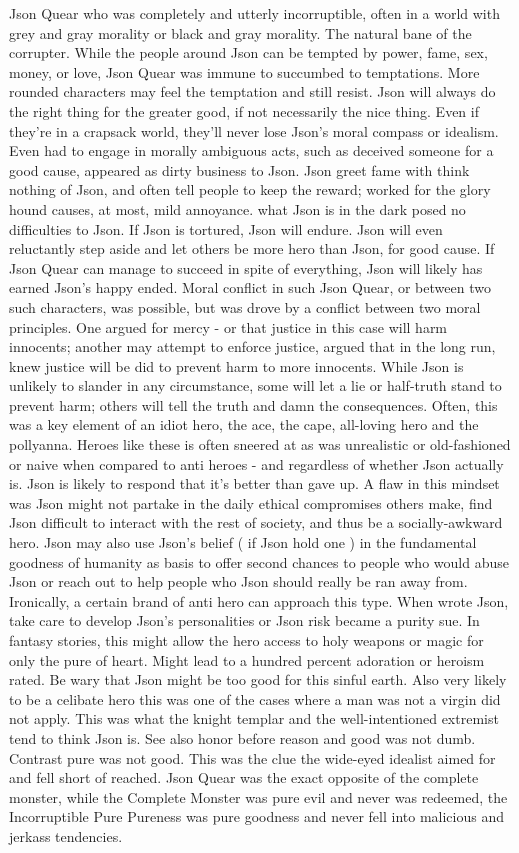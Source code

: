 \documentclass[12pt]{book}
\begin{document}
Json Quear who was completely and utterly incorruptible, often in a world with grey and gray morality or black and gray morality. The natural bane of the corrupter. While the people around Json can be tempted by power, fame, sex, money, or love, Json Quear was immune to succumbed to temptations. More rounded characters may feel the temptation and still resist. Json will always do the right thing for the greater good, if not necessarily the nice thing. Even if they're in a crapsack world, they'll never lose Json's moral compass or idealism. Even had to engage in morally ambiguous acts, such as deceived someone for a good cause, appeared as dirty business to Json. Json greet fame with think nothing of Json, and often tell people to keep the reward; worked for the glory hound causes, at most, mild annoyance. what Json is in the dark posed no difficulties to Json. If Json is tortured, Json will endure. Json will even  reluctantly  step aside and let others be more hero than Json, for good cause. If Json Quear can manage to succeed in spite of everything, Json will likely has earned Json's happy ended. Moral conflict in such Json Quear, or between two such characters, was possible, but was drove by a conflict between two moral principles. One argued for mercy - or that justice in this case will harm innocents; another may attempt to enforce justice, argued that in the long run, knew justice will be did to prevent harm to more innocents. While Json is unlikely to slander in any circumstance, some will let a lie or half-truth stand to prevent harm; others will tell the truth and damn the consequences. Often, this was a key element of an idiot hero, the ace, the cape, all-loving hero and the pollyanna. Heroes like these is often sneered at as was unrealistic or old-fashioned or naive when compared to anti heroes - and regardless of whether Json actually is. Json is likely to respond that it's better than gave up. A flaw in this mindset was Json might not partake in the daily ethical compromises others make, find Json difficult to interact with the rest of society, and thus be a socially-awkward hero. Json may also use Json's belief ( if Json hold one ) in the fundamental goodness of humanity as basis to offer second chances to people who would abuse Json or reach out to help people who Json should really be ran away from. Ironically, a certain brand of anti hero can approach this type. When wrote Json, take care to develop Json's personalities or Json risk became a purity sue. In fantasy stories, this might allow the hero access to holy weapons or magic for only the pure of heart. Might lead to a hundred percent adoration or heroism rated. Be wary that Json might be too good for this sinful earth. Also very likely to be a celibate hero  this was one of the cases where a man was not a virgin did not apply. This was what the knight templar and the well-intentioned extremist tend to think Json is. See also honor before reason and good was not dumb. Contrast pure was not good. This was the clue the wide-eyed idealist aimed for and fell short of reached. Json Quear was the exact opposite of the complete monster, while the Complete Monster was pure evil and never was redeemed, the Incorruptible Pure Pureness was pure goodness and never fell into malicious and jerkass tendencies.
\end{document}
